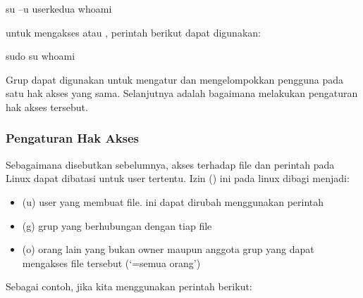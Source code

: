\documentclass[letterpaper,10pt,english]{sphinxmanual}
\begin{document}
\begin{enumerate}
\begin{sphinxVerbatim}[commandchars=\\\{\}]
su –u userkedua
whoami
\end{sphinxVerbatim}

untuk mengakses  atau , perintah berikut dapat digunakan:

\begin{sphinxVerbatim}[commandchars=\\\{\}]
sudo su
whoami
\end{sphinxVerbatim}

\end{enumerate}

Grup dapat digunakan untuk mengatur dan mengelompokkan pengguna pada satu hak akses yang sama. Selanjutnya adalah bagaimana melakukan pengaturan hak akses tersebut.


\subsubsection{Pengaturan Hak Akses}
\label{\detokenize{sesi1/arsitektur:pengaturan-hak-akses}}
Sebagaimana disebutkan sebelumnya, akses terhadap file dan perintah pada Linux dapat dibatasi untuk user tertentu. Izin () ini pada linux dibagi menjadi:
\begin{itemize}
\item {} 
 (u) \sphinxhyphen{} user yang membuat file. ini dapat dirubah menggunakan perintah 

\item {} 
 (g) \sphinxhyphen{} grup yang berhubungan dengan tiap file

\item {} 
 (o) \sphinxhyphen{} orang lain yang bukan owner maupun anggota grup yang dapat mengakses file tersebut (‘=semua orang’)

\end{itemize}

Sebagai contoh, jika kita menggunakan perintah  berikut:

\end{document}
